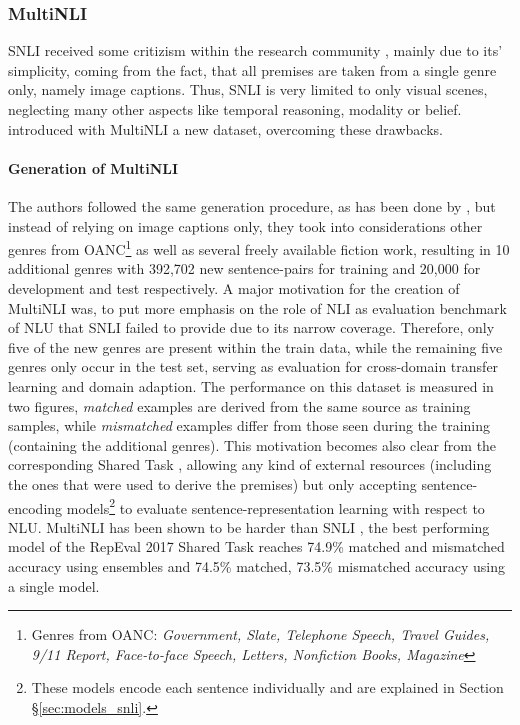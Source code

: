 \subsubsection{MultiNLI}
\ac{SNLI} received some critizism within the research community \citep{chatzikyriakidis2017overview,williams2017broad}, mainly due to its' simplicity, coming from the fact, that all premises are taken from a single genre only, namely image captions. Thus, \ac{SNLI} is very limited to only visual scenes, neglecting many other aspects like temporal reasoning, modality or belief. \cite{williams2017broad} introduced with \ac{MultiNLI} a new dataset, overcoming these drawbacks. 
\paragraph*{Generation of \ac{MultiNLI}}
The authors followed the same generation procedure, as has been done by \cite{bowman2015large}, but instead of relying on image captions only, they took into considerations other genres from \ac{OANC}\footnote{Genres from \ac{OANC}: \textit{Government, Slate, Telephone Speech, Travel Guides, 9/11 Report, Face-to-face Speech, Letters, Nonfiction Books, Magazine}} \citep{ide2001american,ide2004american,ide2006integrating} as well as several freely available fiction work, resulting in 10 additional genres with 392,702 new sentence-pairs for training and 20,000 for development and test respectively. A major motivation for the creation of \ac{MultiNLI} was, to put more emphasis on the role of \ac{NLI} as evaluation benchmark of \ac{NLU} that \ac{SNLI} failed to provide due to its narrow coverage. Therefore, only five of the new genres are present within the train data, while the remaining five genres only occur in the test set, serving as evaluation for cross-domain transfer learning and domain adaption. The performance on this dataset is measured in two figures, \textit{matched} examples are derived from the same source as training samples, while \textit{mismatched} examples differ from those seen during the training (containing the additional genres). This motivation becomes also clear from the corresponding Shared Task \citep{nangia2017repeval}, allowing any kind of external resources (including the ones that were used to derive the premises) but only accepting sentence-encoding models\footnote{These models encode each sentence individually and are explained in Section §\ref{sec:models_snli}.} to evaluate sentence-representation learning with respect to \ac{NLU}. \ac{MultiNLI} has been shown to be harder than \ac{SNLI} \citep{williams2017broad}, the best performing model of the RepEval 2017 Shared Task reaches 74.9\% matched and mismatched accuracy \citep{chen2017recurrent} using ensembles and 74.5\% matched, 73.5\% mismatched accuracy using a single model\citep{nie2017shortcut}. 
